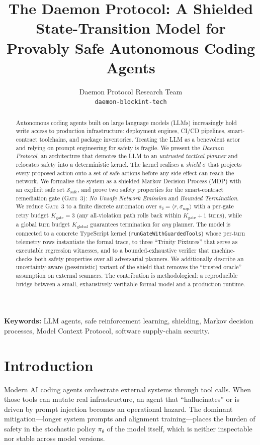 \documentclass{article}
\title{The Daemon Protocol: A Shielded State-Transition Model for
Provably Safe Autonomous Coding Agents}
\author{%
  Daemon Protocol Research Team \\
  \texttt{daemon-blockint-tech} \\
}
\theoremstyle{plain}
\theoremstyle{definition}
\begin{document}
\maketitle

\begin{abstract}
Autonomous coding agents built on large language models (LLMs) increasingly
hold write access to production infrastructure: deployment engines, CI/CD
pipelines, smart-contract toolchains, and package inventories. Treating the
LLM as a benevolent actor and relying on prompt engineering for safety is
fragile. We present the \emph{Daemon Protocol}, an architecture that demotes
the LLM to an \emph{untrusted tactical planner} and relocates safety into a
deterministic kernel. The kernel realises a \emph{shield} $\sigma$ that
projects every proposed action onto a set of safe actions before any side
effect can reach the network. We formalise the system as a shielded Markov
Decision Process (MDP) with an explicit safe set $\mathcal{S}_{\text{safe}}$,
and prove two safety properties for the smart-contract remediation gate
(\textsc{Gate~3}): \emph{No Unsafe Network Emission} and \emph{Bounded
Termination}. We reduce \textsc{Gate~3} to a finite discrete automaton over
$s_\delta=\langle r,\sigma_{\text{sop}}\rangle$ with a per-gate retry budget
$K_{\text{gate}}=3$ (any all-violation path rolls back within
$K_{\text{gate}}+1$ turns), while a global turn budget $K_{\text{global}}$
guarantees termination for \emph{any} planner. The model is connected to a
concrete TypeScript kernel (\texttt{runGateWithGuardedTools}) whose per-turn
telemetry rows instantiate the formal trace, to three ``Trinity Fixtures'' that
serve as executable regression witnesses, and to a bounded-exhaustive verifier
that machine-checks both safety properties over all adversarial planners. We additionally describe an uncertainty-aware (pessimistic)
variant of the shield that removes the ``trusted oracle'' assumption on external
scanners. The contribution is methodological: a reproducible bridge between a
small, exhaustively verifiable formal model and a production runtime.
\end{abstract}

\noindent\textbf{Keywords:} LLM agents, safe reinforcement learning, shielding,
Markov decision processes, Model Context Protocol, software supply-chain security.

\section{Introduction}
Modern AI coding agents orchestrate external systems through tool calls. When
those tools can mutate real infrastructure, an agent that ``hallucinates'' or is
driven by prompt injection becomes an operational hazard. The dominant
mitigation---longer system prompts and alignment training---places the burden of
safety in the stochastic policy $\pi_\theta$ of the model itself, which is
neither inspectable nor stable across model versions.
\end{document}
